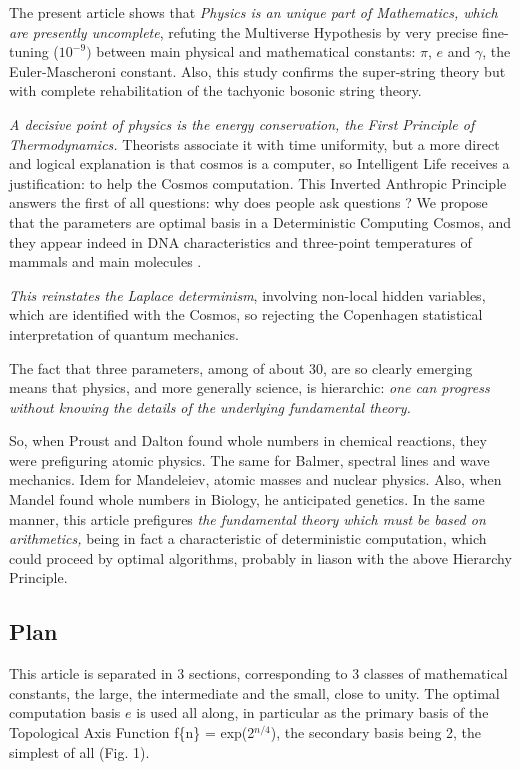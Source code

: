 \documentclass[twoside,draft]{article}
\begin{document}
\begin{sloppypar}
{The present article shows that \textit{Physics is an unique part of Mathematics, which are presently uncomplete}, refuting the Multiverse Hypothesis by very precise fine-tuning ($10^{-9})$ between main physical and mathematical constants: $\pi$, $e$ and $\gamma$, the Euler-Mascheroni constant. Also, this study confirms the super-string theory but with complete rehabilitation of the tachyonic bosonic string theory.

\textit{A decisive point of physics is the energy conservation, the First Principle of Thermodynamics.} Theorists associate it with time uniformity, but a more direct and logical explanation is that cosmos is a computer, so Intelligent Life receives a justification: to help the Cosmos computation. This Inverted Anthropic Principle answers the first of all questions: why does people ask questions ? We propose that the parameters are optimal basis in a Deterministic Computing Cosmos, and they appear indeed in DNA characteristics and three-point temperatures of mammals and main molecules \cite{Sanchez1}.

\textit{This reinstates the Laplace determinism}, involving non-local hidden variables, which are identified with the Cosmos, so rejecting the Copenhagen statistical interpretation of quantum mechanics.

The fact that three parameters, among of about 30, are so clearly emerging means that physics, and more generally science, is hierarchic: \textit{one can progress without knowing the details of the underlying fundamental theory.}

So, when Proust and Dalton found whole numbers in chemical reactions, they were prefiguring atomic physics. The same for Balmer, spectral lines and wave mechanics. Idem for Mandeleiev, atomic masses and nuclear physics. Also, when Mandel found whole numbers in Biology, he anticipated genetics. In the same manner, this article prefigures \textit{the fundamental theory which must be based on arithmetics,} being in fact a characteristic of deterministic computation, which could proceed by optimal algorithms, probably in liason with the above Hierarchy Principle.

\subsection{Plan}
This article is separated in 3 sections, corresponding to 3 classes of mathematical constants, the large, the intermediate and the small, close to unity. The optimal computation basis $e$ is used all along, in particular as the primary basis of the Topological Axis Function f\{n\} = exp(2$^{n/4}$), the secondary basis being 2, the simplest of all (Fig. 1).

}
\end{sloppypar}
\end{document}
